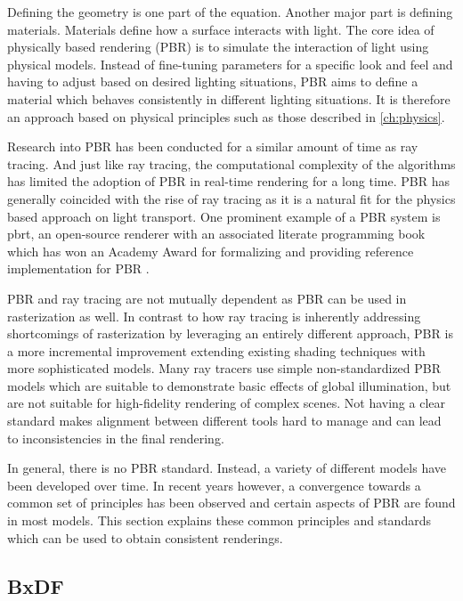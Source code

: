 Defining the geometry is one part of the equation. Another major part is defining materials. Materials define how a surface interacts with light. The core idea of physically based rendering (\gls{PBR}) is to simulate the interaction of light using physical models. Instead of fine-tuning parameters for a specific look and feel and having to adjust based on desired lighting situations, \gls{PBR} aims to define a material which behaves consistently in different lighting situations. It is therefore an approach based on physical principles such as those described in \autoref{ch:physics}.

Research into \gls{PBR} has been conducted for a similar amount of time as ray tracing. And just like ray tracing, the computational complexity of the algorithms has limited the adoption of \gls{PBR} in real-time rendering for a long time. \gls{PBR} has generally coincided with the rise of ray tracing as it is a natural fit for the physics based approach on light transport. One prominent example of a PBR system is \gls{pbrt}, an open-source renderer with an associated literate programming book which has won an Academy Award for formalizing and providing reference implementation for \gls{PBR} \cite{Pharr_Physically_Based_Rendering_2023}.

\gls{PBR} and ray tracing are not mutually dependent as \gls{PBR} can be used in rasterization as well. In contrast to how ray tracing is inherently addressing shortcomings of rasterization by leveraging an entirely different approach, \gls{PBR} is a more incremental improvement extending existing shading techniques with more sophisticated models. Many ray tracers use simple non-standardized \gls{PBR} models which are suitable to demonstrate basic effects of global illumination, but are not suitable for high-fidelity rendering of complex scenes. Not having a clear standard makes alignment between different tools hard to manage and can lead to inconsistencies in the final rendering.

In general, there is no \gls{PBR} standard. Instead, a variety of different models have been developed over time. In recent years however, a convergence towards a common set of principles has been observed and certain aspects of \gls{PBR} are found in most models. This section explains these common principles and standards which can be used to obtain consistent renderings.

\subsection{BxDF}

